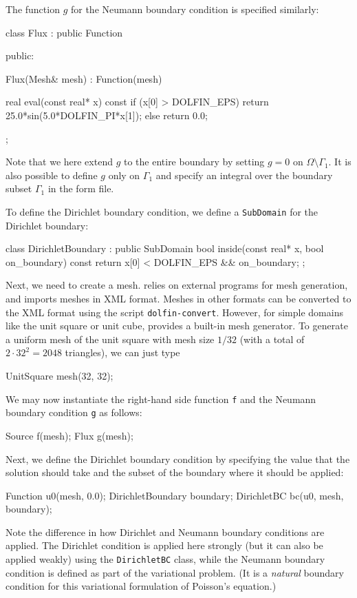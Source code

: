 The function $g$ for the Neumann boundary condition is specified
similarly:
\begin{code}
class Flux : public Function
{
public:

  Flux(Mesh& mesh) : Function(mesh) {}

  real eval(const real* x) const
  {
    if (x[0] > DOLFIN_EPS)
      return 25.0*sin(5.0*DOLFIN_PI*x[1]);
    else
      return 0.0;
  }

};
\end{code}

Note that we here extend $g$ to the entire boundary by setting $g = 0$
on $\Omega \setminus \Gamma_1$. It is also possible to define $g$ only
on $\Gamma_1$ and specify an integral over the boundary subset
$\Gamma_1$ in the form file.

To define the Dirichlet boundary condition, we define a
\texttt{SubDomain} for the Dirichlet boundary:
\begin{code}
class DirichletBoundary : public SubDomain
{
  bool inside(const real* x, bool on_boundary) const
  {
    return x[0] < DOLFIN_EPS && on_boundary;
  }
};
\end{code}

Next, we need to create a mesh. \dolfin{} relies on external programs
for mesh generation, and imports meshes in \dolfin{} XML
format. Meshes in other formats can be converted to the \dolfin{} XML
format using the script \texttt{dolfin-convert}. However, for simple
domains like the unit square or unit cube, \dolfin{} provides a
built-in mesh generator. To generate a uniform mesh of the unit square
with mesh size $1/32$ (with a total of $2\cdot 32^2 = 2048$
triangles), we can just type
\begin{code}
UnitSquare mesh(32, 32);
\end{code}

We may now instantiate the right-hand side function \texttt{f} and the
Neumann boundary condition \texttt{g} as follows:
\begin{code}
Source f(mesh);
Flux g(mesh);
\end{code}

Next, we define the Dirichlet boundary condition by specifying the
value that the solution should take and the subset of the boundary
where it should be applied:
\begin{code}
Function u0(mesh, 0.0);
DirichletBoundary boundary;
DirichletBC bc(u0, mesh, boundary);
\end{code}
Note the difference in how Dirichlet and Neumann boundary conditions
are applied. The Dirichlet condition is applied here strongly (but it
can also be applied weakly) using the \texttt{DirichletBC} class,
while the Neumann boundary condition is defined as part of the
variational problem. (It is a \emph{natural} boundary condition for
this variational formulation of Poisson's equation.)

